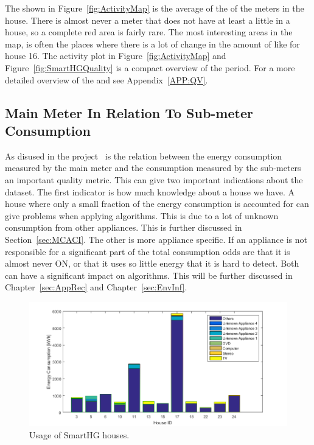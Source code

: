 The  shown in Figure~\ref{fig:ActivityMap} is the average of the  of the meters in the house. There is almost never a meter that does not have at least a little  in a house, so a complete red area is fairly rare. The most interesting areas in the  map, is often the places where there is a lot of change in the amount of  like for house 16. The activity plot in Figure~\ref{fig:ActivityMap} and Figure~\ref{fig:SmartHGQuality} is a compact overview of the period. For a more detailed overview of the  and  see Appendix~\ref{APP:QV}. 

\subsection{Main Meter In Relation To Sub-meter Consumption}
\label{sec:MMIRTSM}
As disused in the  project~\citep{RefWorks:21} is the relation between the energy consumption measured by the main meter and the consumption measured by the sub-meters an important quality metric. This can give two important indications about the dataset. The first indicator is how much knowledge about a house we have. A house where only a small fraction of the energy consumption is accounted for can give problems when applying  algorithms. This is due to a lot of unknown consumption from other appliances. This is further discussed in Section~\ref{sec:MCACI}. The other is more appliance specific. If an appliance is not responsible for a significant part of the total consumption odds are that it is almost never ON, or that it uses so little energy that it is hard to detect. Both can have a significant impact on  algorithms. This will be further discussed in Chapter~\ref{sec:AppRec} and Chapter~\ref{sec:EnvInf}.  

\begin{figure}[H]
\centering
\includegraphics[width=1\textwidth]{billeder/SHGHouseUsagesV2.png}
\caption{Usage of SmartHG houses.}
\label{fig:USAGEofSHG}
\end{figure}

